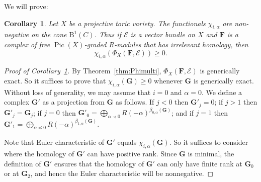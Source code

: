 \documentclass[12pt]{amsart}
\newtheorem{cor}[lemma]{Corollary}
\theoremstyle{definition}
\theoremstyle{remark}
\newcommand{\Pic}{\operatorname{Pic}}
\newcommand{\cE}{\mathcal{E}}
\newcommand{\FF}{\mathbf{F}}
\newcommand{\Gbull}{\mathbf{G}}
\newcommand{\BBQ}{\mathrm{B}}
\begin{document}
We will prove:
\begin{cor}\label{cor:chiialpha}
Let $X$ be a projective toric variety. The functionals $\chi_{i,\alpha}$ are non-negative
on the cone $\BBQ^1(C)$. Thus if $\cE$ is a vector bundle on $X$ and $\FF$ is a complex of free
$\Pic(X)$-graded 
$R$-modules that has irrelevant homology, then
\[
\chi_{i,\alpha}( \Phi_X(\FF, \cE))\geq 0.
\]
\end{cor}


\begin{proof}[Proof of Corollary~\ref{cor:chiialpha}]
By Theorem~\ref{thm:Phimulti}, $\Phi_X(\FF,\cE)$ is generically exact.  So it suffices to prove that $\chi_{i,\alpha}(\Gbull)\geq 0$ whenever $\Gbull$ is generically exact.  Without loss of generality, we may assume that $i=0$ and $\alpha=0$.  We define a complex $\Gbull'$ as a projection from $\Gbull$ as follows.  If $j<0$ then $\Gbull'_j=0$; if $j>1$ then $\Gbull'_j=\Gbull_j$; if $j=0$ then $\Gbull'_0=\bigoplus_{\alpha\prec 0} R(-\alpha)^{\beta_{0,\alpha}(\Gbull)}$; and if $j=1$ then $\Gbull'_1=\bigoplus_{\alpha\preceq 0} R(-\alpha)^{\beta_{1,\alpha}(\Gbull)}$.  

Note that Euler characteristic of $\Gbull'$ equals $\chi_{i,\alpha}(\Gbull)$.  So it suffices to consider where the homology of $\Gbull'$ can have positive rank.  Since $\Gbull$ is minimal, the definition of $\Gbull'$ ensures that the homology of $\Gbull'$ can only have finite rank at $\Gbull_0$ or at $\Gbull_2$, and hence the Euler characteristic will be nonnegative.
\end{proof}
\end{document}
